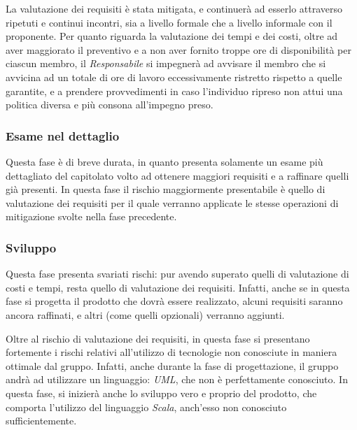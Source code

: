 \documentclass[a4paper]{article}
\begin{document}
				La valutazione dei requisiti è stata mitigata, e continuerà ad esserlo attraverso ripetuti e continui incontri, sia a livello formale 
				che a livello informale con il proponente. Per quanto riguarda la valutazione dei tempi e dei costi, oltre ad aver maggiorato il 
				preventivo e a non aver fornito troppe ore di disponibilità per ciascun membro, il \emph{Responsabile} si impegnerà ad avvisare il 
				membro che si avvicina ad un totale di ore di lavoro eccessivamente ristretto rispetto a quelle garantite, e a prendere provvedimenti 
				in caso l'individuo ripreso non attui una politica diversa e più consona all'impegno preso.
				
			\subsubsection{Esame nel dettaglio}
				Questa fase è di breve durata, in quanto presenta solamente un esame più dettagliato del capitolato volto ad ottenere maggiori requisiti 
				e a raffinare quelli già presenti.
				In questa fase il rischio maggiormente presentabile è quello di valutazione dei requisiti per il quale verranno applicate le stesse 
				operazioni di mitigazione svolte nella fase precedente. 
				
			\subsubsection{Sviluppo}
				Questa fase presenta svariati rischi: pur avendo superato quelli di valutazione di costi e tempi, resta quello di valutazione dei 
				requisiti. Infatti, anche se in questa fase si progetta il prodotto che dovrà essere realizzato, alcuni requisiti saranno ancora 
				raffinati, e altri (come quelli opzionali) verranno aggiunti.
				
				Oltre al rischio di valutazione dei requisiti, in questa fase si presentano fortemente i rischi relativi all'utilizzo di tecnologie 
				non conosciute in maniera ottimale dal gruppo. Infatti, anche durante la fase di progettazione, il gruppo andrà ad utilizzare un 
				linguaggio: \emph{UML}, che non è perfettamente conosciuto. In questa fase, si inizierà anche lo sviluppo vero e proprio del prodotto, che 
				comporta l'utilizzo del linguaggio \emph{Scala}, anch'esso non conosciuto sufficientemente.
				
\end{document}
